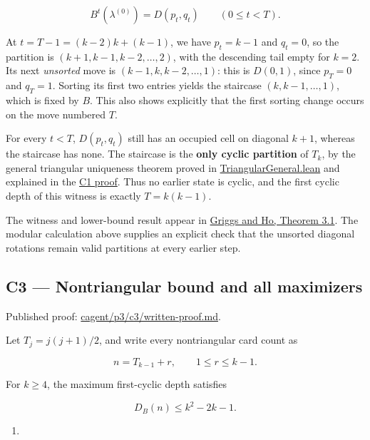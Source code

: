 \documentclass[11pt,a4paper]{article}
\providecommand{\tightlist}{\setlength{\itemsep}{0pt}\setlength{\parskip}{0pt}}
\begin{document}
\[
B^t(\lambda^{(0)})=D(p_t,q_t)\qquad(0\le t<T).
\]

At \(t=T-1=(k-2)k+(k-1)\), we have \(p_t=k-1\) and \(q_t=0\), so the partition is \((k+1,k-1,k-2,\ldots,2)\), with the descending tail empty for \(k=2\). Its next \emph{unsorted} move is \((k-1,k,k-2,\ldots,1)\): this is \(D(0,1)\), since \(p_T=0\) and \(q_T=1\). Sorting its first two entries yields the staircase \((k,k-1,\ldots,1)\), which is fixed by \(B\). This also shows explicitly that the first sorting change occurs on the move numbered \(T\).

For every \(t<T\), \(D(p_t,q_t)\) still has an occupied cell on diagonal \(k+1\), whereas the staircase has none. The staircase is the \textbf{only cyclic partition} of \(T_k\), by the general triangular uniqueness theorem proved in \href{https://github.com/mpelteshki/climbing-to-the-frontier/blob/212bba53b1818c08c40b8c4b48f636651eaf6410/cagent/p3/lean/ProofPursuit/P3/TriangularGeneral.lean}{TriangularGeneral.lean} and explained in the \href{https://github.com/mpelteshki/climbing-to-the-frontier/blob/212bba53b1818c08c40b8c4b48f636651eaf6410/cagent/p3/c1/written-proof.md}{C1 proof}. Thus no earlier state is cyclic, and the first cyclic depth of this witness is exactly \(T=k(k-1)\).

The witness and lower-bound result appear in \href{https://sc.edu/study/colleges_schools/artsandsciences/mathematics/research/imi/research/documents/1998/1998_12.pdf}{Griggs and Ho, Theorem 3.1}. The modular calculation above supplies an explicit check that the unsorted diagonal rotations remain valid partitions at every earlier step.

\subsection{C3 --- Nontriangular bound and all maximizers}\label{c3-nontriangular-bound-and-all-maximizers}

Published proof: \href{https://github.com/mpelteshki/climbing-to-the-frontier/blob/212bba53b1818c08c40b8c4b48f636651eaf6410/cagent/p3/c3/written-proof.md}{cagent/p3/c3/written-proof.md}.

Let \(T_j=j(j+1)/2\), and write every nontriangular card count as

\[
n=T_{k-1}+r,\qquad 1\le r\le k-1.
\]

For \(k\ge4\), the maximum first-cyclic depth satisfies

\[
D_B(n)\le k^2-2k-1.
\]

\begin{enumerate}
\def\labelenumi{(\Alph{enumi})}
\tightlist
\item
\end{enumerate}
\end{document}
